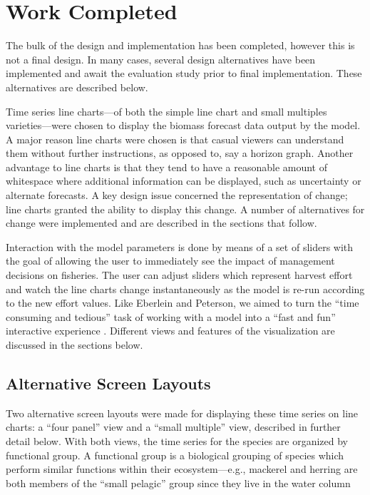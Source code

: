 \chapter{Work Completed}

The bulk of the design and implementation has been completed, however this is not a final design.  In many cases, several design alternatives have been implemented and await the evaluation study prior to final implementation.  These alternatives are described below.

Time series line charts---of both the simple line chart and small multiples varieties---were chosen to display the biomass forecast data output by the model.  A major reason line charts were chosen is that casual viewers can understand them without further instructions, as opposed to, say a horizon graph.  Another advantage to line charts is that they tend to have a reasonable amount of whitespace where additional information can be displayed, such as uncertainty or alternate forecasts. A key design issue concerned the representation of change; line charts granted the ability to display this change.  A number of alternatives for change were implemented and are described in the sections that follow.

Interaction with the model parameters is done by means of a set of sliders with the goal of allowing the user to immediately see the impact of management decisions on fisheries.  The user can adjust sliders which represent harvest effort and watch the line charts change instantaneously as the model is re-run according to the new effort values.  Like Eberlein and Peterson, we aimed to turn the ``time consuming and tedious'' task of working with a model into a ``fast and fun'' interactive experience \cite{eberlein1992}.  Different views and features of the visualization are discussed in the sections below.  

\section{Alternative Screen Layouts}

Two alternative screen layouts were made for displaying these time series on line charts: a ``four panel'' view and a ``small multiple'' view, described in further detail below.  With both views, the time series for the species are organized by functional group.  A functional group is a biological grouping of species which perform similar functions within their ecosystem---e.g., mackerel and herring are both members of the ``small pelagic'' group since they live in the water column

